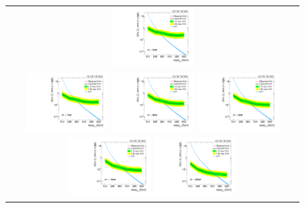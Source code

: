\begin{figure}[!h]
\begin{tabular}{c}
    \includegraphics[width=0.29\textwidth]{figures/analysis/Interpretation/ExclusionLimits/LimitPlot_ctau6cm.pdf} \\
    \includegraphics[width=0.29\textwidth]{figures/analysis/Interpretation/ExclusionLimits/LimitPlot_ctau7cm.pdf} 
    \includegraphics[width=0.29\textwidth]{figures/analysis/Interpretation/ExclusionLimits/LimitPlot_ctau8cm.pdf} 
    \includegraphics[width=0.29\textwidth]{figures/analysis/Interpretation/ExclusionLimits/LimitPlot_ctau9cm.pdf} \\
    \includegraphics[width=0.29\textwidth]{figures/analysis/Interpretation/ExclusionLimits/LimitPlot_ctau10cm.pdf} 
    \includegraphics[width=0.29\textwidth]{figures/analysis/Interpretation/ExclusionLimits/LimitPlot_ctau20cm.pdf} 

\end{tabular}
\end{figure}
